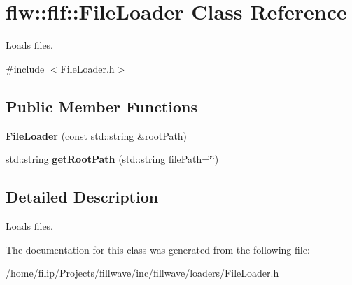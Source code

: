 \hypertarget{classflw_1_1flf_1_1FileLoader}{}\section{flw\+:\+:flf\+:\+:File\+Loader Class Reference}
\label{classflw_1_1flf_1_1FileLoader}


Loads files.  




{\ttfamily \#include $<$File\+Loader.\+h$>$}

\subsection*{Public Member Functions}
\begin{DoxyCompactItemize}
\item 
{\bfseries File\+Loader} (const std\+::string \&root\+Path)\hypertarget{classflw_1_1flf_1_1FileLoader_a600a5a31f5658122a037e464f59010da}{}\label{classflw_1_1flf_1_1FileLoader_a600a5a31f5658122a037e464f59010da}

\item 
std\+::string {\bfseries get\+Root\+Path} (std\+::string file\+Path=\char`\"{}\char`\"{})\hypertarget{classflw_1_1flf_1_1FileLoader_a9cdf33046f1616a0e75ae1eea9e06448}{}\label{classflw_1_1flf_1_1FileLoader_a9cdf33046f1616a0e75ae1eea9e06448}

\end{DoxyCompactItemize}


\subsection{Detailed Description}
Loads files. 

The documentation for this class was generated from the following file\+:\begin{DoxyCompactItemize}
\item 
/home/filip/\+Projects/fillwave/inc/fillwave/loaders/File\+Loader.\+h\end{DoxyCompactItemize}
